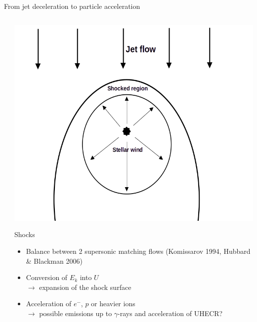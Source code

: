 \begin{frame}{From jet deceleration to particle acceleration}
{\begin{columns}
\begin{column}{0.5\textwidth}
		\end{column}
		\begin{column}{0.5\textwidth}
			\centering
			\includegraphics[width=.9\linewidth]{images/jet_wind.png}
				\begin{exampleblock}{Shocks}
				\begin{itemize}
					\item Balance between 2 supersonic matching flows (Komissarov 1994, Hubbard \& Blackman 2006)
					\item Conversion of $E_{k}$ into $U$ \\
						$\rightarrow$ expansion of the shock surface  \\
					\item Acceleration of $e^{-}$, $p$ or heavier ions\\
						$\rightarrow$ possible emissions up to $\gamma$-rays and
						acceleration of UHECR?
				\end{itemize}
			\end{exampleblock}

		\end{column}
	\end{columns}
	}
\end{frame}


